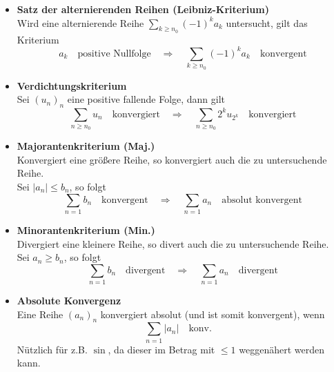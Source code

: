 \documentclass{article}
\begin{document}
\begin{itemize}
	\item \textbf{Satz der alternierenden Reihen (Leibniz-Kriterium)}\\
	Wird eine alternierende Reihe $\sum_{k\geq n_0} (-1)^k a_k$ untersucht, gilt das Kriterium
		\begin{equation}
			a_k \quad\text{positive Nullfolge} \quad\Rightarrow\quad \sum_{k\geq n_0} (-1)^k a_k \quad\text{konvergent}
		\end{equation}


	\item \textbf{Verdichtungskriterium}\\
	Sei $(u_n)_n$ eine positive fallende Folge, dann gilt
		\begin{equation}
			\sum_{n\geq n_0} u_n \quad\text{konvergiert} \quad\Rightarrow\quad \sum_{n\geq n_0} 2^k u_{2^k} \quad\text{konvergiert}
		\end{equation}


	\item \textbf{Majorantenkriterium (Maj.)}\\
	Konvergiert eine größere Reihe, so konvergiert auch die zu untersuchende Reihe.\\
	Sei $|a_n|\leq b_n$, so folgt
		\begin{equation}
			\sum_{n=1} b_n \quad \text{konvergent} \quad\Rightarrow\quad \sum_{n=1} a_n \quad \text{absolut konvergent}
		\end{equation}
		
		
	\item \textbf{Minorantenkriterium (Min.)}\\
	Divergiert eine kleinere Reihe, so divert auch die zu untersuchende Reihe.\\
	Sei $a_n\geq b_n$, so folgt
		\begin{equation}
			\sum_{n=1} b_n \quad \text{divergent} \quad\Rightarrow\quad \sum_{n=1} a_n \quad \text{divergent}
		\end{equation}
		
	
	\item \textbf{Absolute Konvergenz}\\
	Eine Reihe $(a_n)_n$ konvergiert absolut (und ist somit konvergent), wenn
		\begin{equation}
			\sum_{n=1} |a_n| \quad\text{konv.}\quad
		\end{equation}
	\textcolor{gruen}{Nützlich für z.B. $\sin$, da dieser im Betrag mit $\leq 1$ weggenähert werden kann.}
\end{itemize}
\end{document}
